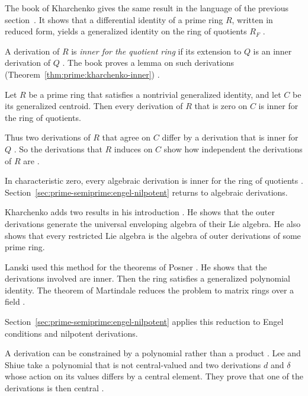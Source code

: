 The book of Kharchenko gives the same result in the language of the previous
section~\cite[Theorem~2.4.1, pp.~112--113]{Kharchenko1991}. It shows that a differential identity of a prime ring $R$, written in
reduced form, yields a generalized identity on the ring of quotients $R_F$
\cite[Theorem~2.4.1, pp.~112--113]{Kharchenko1991}.

A derivation of $R$ is \emph{inner for the quotient ring} if its extension to
$Q$ is an inner derivation of $Q$ \cite[p.~156]{Kharchenko1978}. The book
proves a lemma on such derivations (Theorem~\ref{thm:prime:kharchenko-inner})
\cite[Lemma~2.4.2, p.~113]{Kharchenko1991}.

\begin{theorem}\label{thm:prime:kharchenko-inner}
Let $R$ be a prime ring that satisfies a nontrivial generalized identity, and let
$C$ be its generalized centroid. Then every derivation of $R$ that is zero on
$C$ is inner for the ring of quotients.
\end{theorem}

Thus two derivations of $R$ that agree on $C$ differ by a derivation that is
inner for $Q$ \cite[p.~114]{Kharchenko1991}. So the derivations that $R$
induces on $C$ show how independent the derivations of $R$ are
\cite[p.~114]{Kharchenko1991}.

In characteristic zero, every algebraic derivation is inner for the ring of
quotients \cite[p.~155]{Kharchenko1978}.
Section~\ref{sec:prime-semiprime:engel-nilpotent} returns to algebraic
derivations.

Kharchenko adds two results in his introduction \cite[p.~155]{Kharchenko1978}.
He shows that the outer derivations generate the universal enveloping algebra
of their Lie algebra. He also shows that every restricted Lie algebra is the
algebra of outer derivations of some prime ring.

Lanski used this method for the theorems of Posner \cite[p.~276]{Lanski1988}.
He shows that the derivations involved are inner. Then the ring satisfies a
generalized polynomial identity. The theorem of Martindale reduces the problem
to matrix rings over a field \cite[p.~276]{Lanski1988}.

Section~\ref{sec:prime-semiprime:engel-nilpotent} applies this reduction to
Engel conditions and nilpotent derivations.

A derivation can be constrained by a polynomial rather than a product
\cite[Abstract]{LeeShiue1998Cocentralizing}. Lee and Shiue take a polynomial
that is not central-valued and two derivations $d$ and $\delta$ whose action
on its values differs by a central element. They prove that one of the
derivations is then central \cite[Abstract]{LeeShiue1998Cocentralizing}.

